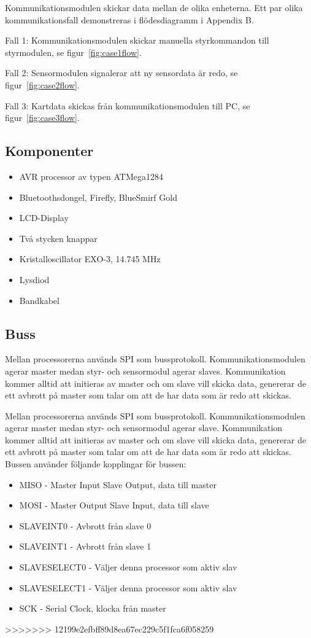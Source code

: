 \documentclass[a4paper,12pt,fleqn]{article}
\begin{document}
Kommunikationsmodulen skickar data mellan de olika enheterna. Ett par olika kommunikationsfall demonstreras i flödesdiagramm i Appendix B.

Fall 1: Kommunikationsmodulen skickar manuella styrkommandon till styrmodulen, se figur~\ref{fig:case1flow}.

Fall 2: Sensormodulen signalerar att ny sensordata är redo, se  figur~\ref{fig:case2flow}.

Fall 3: Kartdata skickas från kommunikationsmodulen till PC, se figur~\ref{fig:case3flow}. 
 
\subsection{Komponenter}
\begin{itemize}
  \item AVR processor av typen ATMega1284
  \item Bluetoothsdongel, Firefly, BlueSmirf Gold
  \item LCD-Display
  \item Två stycken knappar
  \item Kristalloscillator EXO-3, 14.745 MHz
  \item Lysdiod
  \item Bandkabel
\end{itemize}

\subsection{Buss}
Mellan processorerna används SPI som bussprotokoll. Kommunikationsmodulen agerar master medan styr- och sensormodul agerar slaves. Kommunikation kommer alltid att initieras av master och om slave vill skicka data, genererar de ett avbrott på master som talar om att de har data som är redo att skickas. 

Mellan processorerna används SPI som bussprotokoll. Kommunikationsmodulen agerar master medan styr- och sensormodul agerar slave. Kommunikation kommer alltid att initieras av master och om slave vill skicka data, genererar de ett avbrott på master som talar om att de har data som är redo att skickas. Bussen använder följande kopplingar för bussen:
\begin{itemize}
	\item MISO - Master Input Slave Output, data till master
	\item MOSI - Master Output Slave Input, data till slave
	\item SLAVEINT0 - Avbrott från slave 0
	\item SLAVEINT1 - Avbrott från slave 1 
	\item SLAVESELECT0 - Väljer denna processor som aktiv slav
	\item SLAVESELECT1 - Väljer denna processor som aktiv slav
	\item SCK - Serial Clock, klocka från master
\end{itemize}
>>>>>>> 12199e2efbff89d8ea67ec229c5f1fca6f058259
\end{document}
